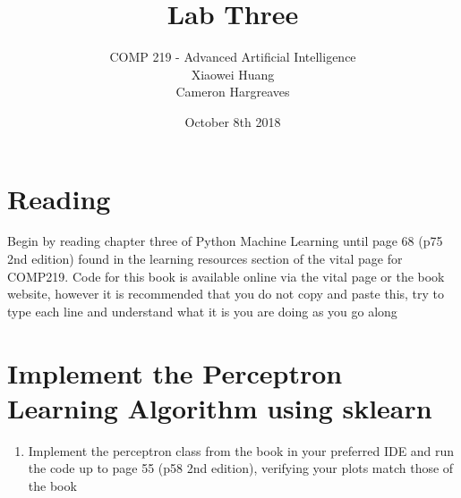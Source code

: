 \documentclass[12pt]{article}
\begin{document}


\date{October 8th 2018}
 
 
\title{Lab Three}%
\author{COMP 219 - Advanced Artificial Intelligence \\
		Xiaowei Huang \\ 
		Cameron Hargreaves\\}
 
\maketitle

\section{Reading}
Begin by reading chapter three of Python Machine Learning until page 68 (p75 2nd edition) found in the learning resources section of the vital page for COMP219. Code for this book is available online via the vital page or the book website, however it is recommended that you do not copy and paste this, try to type each line and understand what it is you are doing as you go along

\section{Implement the Perceptron Learning Algorithm using sklearn}
\begin{enumerate}
\item Implement the perceptron class from the book in your preferred IDE and run the code up to page 55 (p58 2nd edition), verifying your plots match those of the book
\end{enumerate}
\end{document}
